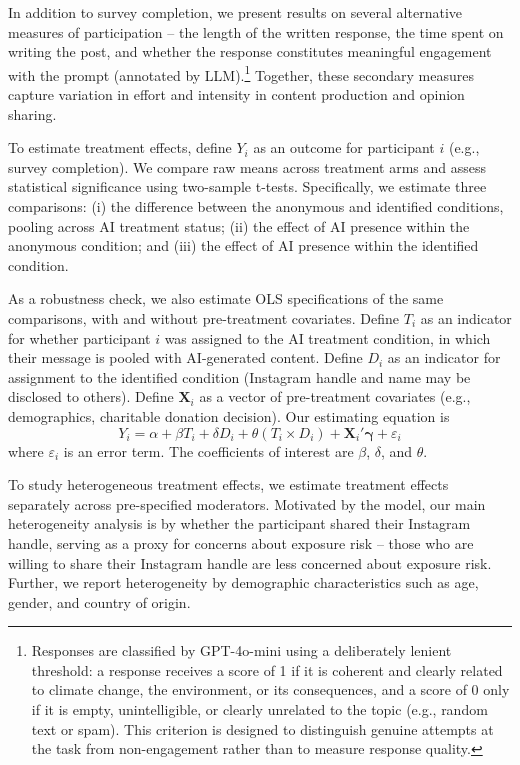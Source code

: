 \documentclass[12pt,notitlepage]{article}
\theoremstyle{plain}
\theoremstyle{plain}
\theoremstyle{definition}
\theoremstyle{definition}
\theoremstyle{assumption}
\theoremstyle{plain}
\theoremstyle{plain}
\theoremstyle{plain}
\theoremstyle{plain}
\theoremstyle{definition}%
\theoremstyle{plain}
\theoremstyle{plain}
\theoremstyle{plain}
\theoremstyle{plain}
\begin{document}
In addition to survey completion, we present results on several alternative measures of participation -- the length of the written response, the time spent on writing the post, and whether the response constitutes meaningful engagement with the prompt (annotated by LLM).\footnote{Responses are classified by GPT-4o-mini using a deliberately lenient threshold: a response receives a score of 1 if it is coherent and clearly related to climate change, the environment, or its consequences, and a score of 0 only if it is empty, unintelligible, or clearly unrelated to the topic (e.g., random text or spam). This criterion is designed to distinguish genuine attempts at the task from non-engagement rather than to measure response quality.} Together, these secondary measures capture variation in effort and intensity in content production and opinion sharing.

To estimate treatment effects, define $Y_{i}$ as an outcome for participant $i$ (e.g., survey completion). We compare raw means across treatment arms and assess statistical significance using two-sample t-tests. Specifically, we estimate three comparisons: (i) the difference between the anonymous and identified conditions, pooling across AI treatment status; (ii) the effect of AI presence within the anonymous condition; and (iii) the effect of AI presence within the identified condition. 

As a robustness check, we also estimate OLS specifications of the same comparisons, with and without pre-treatment covariates. Define $T_{i}$ as an indicator for whether participant $i$ was assigned to the AI treatment condition, in which their message is pooled with AI-generated content. Define $D_{i}$ as an indicator for assignment to the identified condition (Instagram handle and name may be disclosed to others). Define $\boldsymbol{X}_{i}$ as a vector of pre-treatment covariates (e.g., demographics, charitable donation decision). Our estimating equation is 
\begin{equation}
Y_{i}=\alpha+\beta T_{i}+\delta D_{i}+\theta\left(T_{i}\times D_{i}\right)
+\boldsymbol{X}_{i}'\boldsymbol{\gamma}+\varepsilon_{i}\label{eq:ATE}
\end{equation}
where $\varepsilon_{i}$ is an error term. The coefficients of interest are $\beta$, $\delta$, and $\theta$.

To study heterogeneous treatment effects, we estimate treatment effects separately across pre-specified moderators. Motivated by the model, our main heterogeneity analysis is by whether the participant shared their Instagram handle, serving as a proxy for concerns about exposure risk -- those who are willing to share their Instagram handle are less concerned about exposure risk. Further, we report heterogeneity by demographic characteristics such as age, gender, and country of origin.
\end{document}
